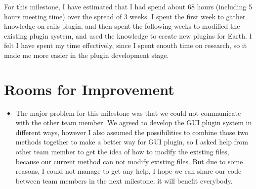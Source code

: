 \documentclass{article}
\begin{document}
For this milestone, I have estimated that I had spend about 68 hours (including 5 hours meeting time) over the spread of 3 weeks. I spent the first week to gather knowledge on rails plugin, and then spent the following weeks to modified the existing plugin system, and used the knowledge to create new plugins for Earth. I felt I have spent my time effectively, since I spent enouth time on research, so it made me more easier in the plugin development stage. 

\section*{Rooms for Improvement}

\begin{itemize}
   \item The major problem for this milestone was that we could not communicate with the other team member. We agreed to develop the GUI plugin system in different ways, however I also assumed the possibilities to combine those two methods together to make a better way for GUI plugin, so I asked help from other team member to get the idea of how to modify the existing files, because our current method can not modify existing files. But due to some reasons, I could not manage to get any help, I hope we can share our code between team members in the next milestone, it will benefit everybody.
\end{itemize}
\end{document}

